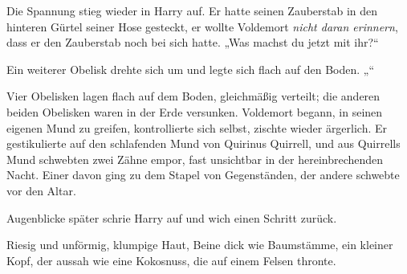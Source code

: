 Die Spannung stieg wieder in Harry auf. Er hatte seinen Zauberstab in den hinteren Gürtel seiner Hose gesteckt, er wollte Voldemort \emph{nicht daran erinnern}, dass er den Zauberstab noch bei sich hatte.
„Was machst du jetzt mit ihr?“

Ein weiterer Obelisk drehte sich um und legte sich flach auf den Boden.
„“

Vier Obelisken lagen flach auf dem Boden, gleichmäßig verteilt; die anderen beiden Obelisken waren in der Erde versunken.
Voldemort begann, in seinen eigenen Mund zu greifen, kontrollierte sich selbst, zischte wieder ärgerlich. Er gestikulierte auf den schlafenden Mund von Quirinus Quirrell, und aus Quirrells Mund schwebten zwei Zähne empor, fast unsichtbar in der hereinbrechenden Nacht. Einer davon ging zu dem Stapel von Gegenständen, der andere schwebte vor den Altar.

Augenblicke später schrie Harry auf und wich einen Schritt zurück.

Riesig und unförmig, klumpige Haut, Beine dick wie Baumstämme, ein kleiner Kopf, der aussah wie eine Kokosnuss, die auf einem Felsen thronte.

